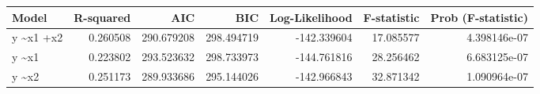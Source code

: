 \begin{tabular}{lrrrrrr}
\toprule
      Model &  R-squared &         AIC &         BIC &  Log-Likelihood &  F-statistic &  Prob (F-statistic) \\
\midrule
 y \textasciitilde  x1 +x2 &   0.260508 &  290.679208 &  298.494719 &     -142.339604 &    17.085577 &        4.398146e-07 \\
     y \textasciitilde  x1 &   0.223802 &  293.523632 &  298.733973 &     -144.761816 &    28.256462 &        6.683125e-07 \\
      y \textasciitilde x2 &   0.251173 &  289.933686 &  295.144026 &     -142.966843 &    32.871342 &        1.090964e-07 \\
\bottomrule
\end{tabular}
